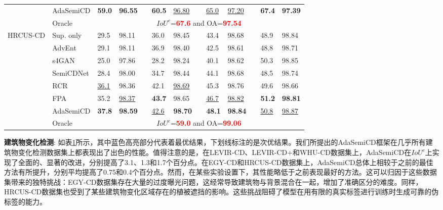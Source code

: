 \documentclass[lang=chs, degree=master, blindreview=false, adobe=false]{yanputhesis}
\begin{document}
\begin{table}[!htbp]
{\begin{tabular}{p{20mm}p{25mm}p{8mm}p{8mm}cp{8mm}p{8mm}cp{8mm}p{8mm}cp{8mm}p{8mm}}
      \rowcolor{mycyan}
      \multirow{-8}{*}{\cellcolor{white}}& \cellcolor{white}AdaSemiCD   &   \textbf{59.0} & \textbf{96.55} && \textbf{60.5} & \cellcolor{white}\underline{96.80} & \cellcolor{white} & \cellcolor{white}\underline{65.0} & \cellcolor{white}\underline{97.20} & \cellcolor{white}& \textbf{67.4} & \textbf{97.39} \\%
      \cline{2-13}
      & Oracle & \multicolumn{11}{c}{$ IoU^c$=\textcolor{red}{\bf 67.6} and OA=\textcolor{red}{\bf 97.54}} \\
      \bottomrule
      \multirow{8}{*}{HRCUS-CD}
      & Sup. only   &   29.5 & 98.11 && 36.0 & 98.45 && 43.4 & 98.68 && 48.9 & 98.84 \\ %
      & AdvEnt\cite{vu2019advent}& 29.1 & 98.11 && 36.9 & 98.40 && 42.5 & 98.61 && 48.8 & 98.71 \\ %
      & s4GAN\cite{mittal2019semi}& 25.0 & 97.86 && 28.2 & 98.24 && 40.1 & 98.62 && 50.3 & 98.85 \\
      & SemiCDNet\cite{peng2021SemiCDNet} & 28.4 & 98.00 && 34.7 & 98.44 && 44.1 & 98.68 && 48.5 & 98.74 \\ %
      & RCR\cite{bandara2022RCR}& \underline{36.1} & 98.36 && 42.1 & \underline{98.69} && 45.3 & 98.76 && 49.6 & 98.66 \\

      & FPA\cite{Zhang2023FPA}& 35.2 & \underline{98.37} && \cellcolor{mycyan}\textbf{43.7} & 98.65 && \underline{46.7} & \underline{98.82} && \cellcolor{mycyan}\textbf{51.2} & \textbf{98.81} \\

      \rowcolor{mycyan}
      \multirow{-8}{*}{\cellcolor{white}}& \cellcolor{white}AdaSemiCD   &  \textbf{37.8} & \cellcolor{mycyan}\textbf{98.59} && \cellcolor{white}\underline{42.6} & \textbf{98.70} && \textbf{48.1} & \textbf{98.84} && \cellcolor{white}\underline{50.8} & \underline{98.87} \\%
      \cline{2-13}
      & Oracle & \multicolumn{11}{c}{$ IoU^c$=\textcolor{red}{\bf 59.0} and OA=\textcolor{red}{\bf 99.06}} \\
      \bottomrule
  \end{tabular}
  }
  \label{tab:Ada-building}
\end{table}

\textbf{建筑物变化检测}:
如表\ref{tab:Ada-building}所示，其中蓝色高亮部分代表着最优结果，下划线标注的是次优结果。我们所提出的AdaSemiCD框架在几乎所有建筑物变化检测数据集上都表现出了出色的性能。值得注意的是，在LEVIR-CD、LEVIR-CD+和WHU-CD数据集上，AdaSemiCD在$IoU^c$上实现了全面的、显著的改进，分别提高了3.1、1.3和1.7个百分点。在EGY-CD和HRCUS-CD数据集上，AdaSemiCD总体上相较于之前的最佳方法有所提升，分别平均提高了0.75和0.4个百分点。然而，在某些实验设置下，其性能略低于之前表现最好的方法。这可以归因于这些数据集带来的独特挑战：EGY-CD数据集存在大量的过度曝光问题，这经常导致建筑物与背景混合在一起，增加了准确区分的难度。同样，HRCUS-CD数据集也受到了某些建筑物变化区域存在的植被遮挡的影响。这些挑战阻碍了模型在用有限的真实标签进行训练时生成可靠的伪标签的能力。
\end{document}
